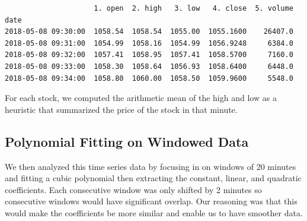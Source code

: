 \documentclass[final]{article}
\begin{document}
\begin{verbatim}
                     1. open  2. high   3. low   4. close  5. volume
date
2018-05-08 09:30:00  1058.54  1058.54  1055.00  1055.1600    26407.0
2018-05-08 09:31:00  1054.99  1058.16  1054.99  1056.9248     6384.0
2018-05-08 09:32:00  1057.41  1058.95  1057.41  1058.5700     7160.0
2018-05-08 09:33:00  1058.30  1058.64  1056.93  1058.6400     6448.0
2018-05-08 09:34:00  1058.80  1060.00  1058.50  1059.9600     5548.0
\end{verbatim}

For each stock, we computed the arithmetic mean of the high and low as a
heuristic that summarized the price of the stock in that minute.

\subsection{Polynomial Fitting on Windowed Data}

We then analyzed this time series data by focusing in on windows of 20 minutes
and fitting a cubic polynomial then extracting the constant, linear, and
quadratic coefficients. Each consecutive window was only shifted by 2 minutes
so consecutive windows would have significant overlap. Our reasoning was that
this would make the coefficients be more similar and enable us to have smoother
data.
\end{document}
